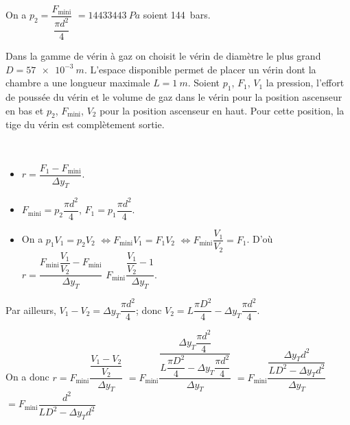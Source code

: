 \begin{multicols}{2}
\ifprof
\begin{corrige}~\\
On a $p_2 = \dfrac{F_{\text{mini}}}{\dfrac{\pi d^2}{4}}$ $=\SI{14433443}{Pa}$ soient \SI{144}{bars}.
\end{corrige}
\else
\fi

\ifprof
\else
Dans la gamme de vérin à gaz on choisit le vérin de diamètre le plus grand
$D=\SI{57e-3}{m}$. L’espace disponible permet de placer un vérin dont la chambre
a une longueur maximale $L=\SI{1}{m}$. Soient $p_1$, $F_1$, $V_1$ la pression,
l’effort de poussée du vérin et le volume de gaz dans le vérin pour la position
ascenseur en bas et $p_2$, $F_{\text{mini}}$, $V_2$ pour la position ascenseur en haut. Pour cette
position, la tige du vérin est complètement sortie.
\fi


\ifprof
\begin{corrige}~\\
\begin{itemize}
\item $r=\dfrac{F_1-F_{\text{mini}}}{\Delta y_T}$.
\item $F_{\text{mini}}=p_2\dfrac{\pi d^2}{4}$, $F_1=p_1\dfrac{\pi d^2}{4}$.
\item On a $p_1 V_1 = p_2 V_2$  $\Leftrightarrow F_{\text{mini}} V_1 = F_1 V_2$ $\Leftrightarrow F_{\text{mini}} \dfrac{V_1}{V_2} = F_1$. D'où $r=\dfrac{F_{\text{mini}} \dfrac{V_1}{V_2}-F_{\text{mini}}}{\Delta y_T}$
$F_{\text{mini}}\dfrac{ \dfrac{V_1}{V_2}-1}{\Delta y_T}$.
\end{itemize}
Par ailleurs, $V_1-V_2=\Delta y_T \dfrac{\pi d^2}{4}$; donc $V_2 = L\dfrac{\pi D^2}{4}-\Delta y_T \dfrac{\pi d^2}{4}$.

On a donc $r=F_{\text{mini}}\dfrac{ \dfrac{V_1-V_2}{V_2}}{\Delta y_T}$ $ =F_{\text{mini}}\dfrac{ \dfrac{\Delta y_T \dfrac{\pi d^2}{4}}{ L\dfrac{\pi D^2}{4}-\Delta y_T \dfrac{\pi d^2}{4}}}{\Delta y_T}$ 
$ =F_{\text{mini}}\dfrac{ \dfrac{\Delta y_T  d^2}{ L D^2-\Delta y_T d^2}}{\Delta y_T}$ 
$ =F_{\text{mini}}\dfrac{ d^2}{ L D^2-\Delta y_T d^2}$ 
\end{corrige}
\else
\fi


\end{multicols}
